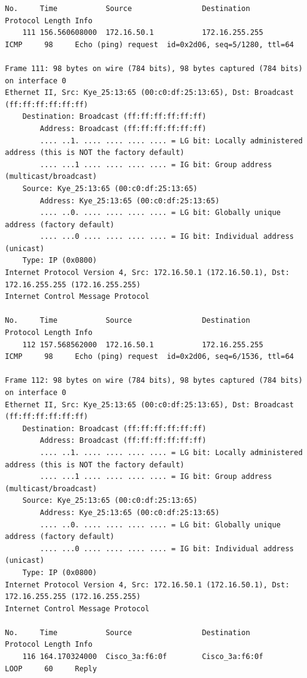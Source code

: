 \documentclass[a4paper,11pt]{article}
\begin{document}
\begin{lstlisting}
No.     Time           Source                Destination           Protocol Length Info
    111 156.560608000  172.16.50.1           172.16.255.255        ICMP     98     Echo (ping) request  id=0x2d06, seq=5/1280, ttl=64

Frame 111: 98 bytes on wire (784 bits), 98 bytes captured (784 bits) on interface 0
Ethernet II, Src: Kye_25:13:65 (00:c0:df:25:13:65), Dst: Broadcast (ff:ff:ff:ff:ff:ff)
    Destination: Broadcast (ff:ff:ff:ff:ff:ff)
        Address: Broadcast (ff:ff:ff:ff:ff:ff)
        .... ..1. .... .... .... .... = LG bit: Locally administered address (this is NOT the factory default)
        .... ...1 .... .... .... .... = IG bit: Group address (multicast/broadcast)
    Source: Kye_25:13:65 (00:c0:df:25:13:65)
        Address: Kye_25:13:65 (00:c0:df:25:13:65)
        .... ..0. .... .... .... .... = LG bit: Globally unique address (factory default)
        .... ...0 .... .... .... .... = IG bit: Individual address (unicast)
    Type: IP (0x0800)
Internet Protocol Version 4, Src: 172.16.50.1 (172.16.50.1), Dst: 172.16.255.255 (172.16.255.255)
Internet Control Message Protocol

No.     Time           Source                Destination           Protocol Length Info
    112 157.568562000  172.16.50.1           172.16.255.255        ICMP     98     Echo (ping) request  id=0x2d06, seq=6/1536, ttl=64

Frame 112: 98 bytes on wire (784 bits), 98 bytes captured (784 bits) on interface 0
Ethernet II, Src: Kye_25:13:65 (00:c0:df:25:13:65), Dst: Broadcast (ff:ff:ff:ff:ff:ff)
    Destination: Broadcast (ff:ff:ff:ff:ff:ff)
        Address: Broadcast (ff:ff:ff:ff:ff:ff)
        .... ..1. .... .... .... .... = LG bit: Locally administered address (this is NOT the factory default)
        .... ...1 .... .... .... .... = IG bit: Group address (multicast/broadcast)
    Source: Kye_25:13:65 (00:c0:df:25:13:65)
        Address: Kye_25:13:65 (00:c0:df:25:13:65)
        .... ..0. .... .... .... .... = LG bit: Globally unique address (factory default)
        .... ...0 .... .... .... .... = IG bit: Individual address (unicast)
    Type: IP (0x0800)
Internet Protocol Version 4, Src: 172.16.50.1 (172.16.50.1), Dst: 172.16.255.255 (172.16.255.255)
Internet Control Message Protocol

No.     Time           Source                Destination           Protocol Length Info
    116 164.170324000  Cisco_3a:f6:0f        Cisco_3a:f6:0f        LOOP     60     Reply


\end{lstlisting}
\end{document}
